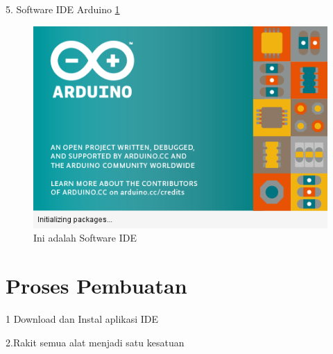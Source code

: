 \documentclass{article}
\begin{document}
 5. Software IDE Arduino
 \ref{ide}
  \begin{figure}[ht]
  \centerline{\includegraphics[width=1\textwidth]{../figures/ide.png}}
  \caption{Ini adalah Software IDE}
  \label{ide}
  \end{figure}


\section{Proses Pembuatan}

1 Download dan Instal aplikasi IDE 

2.Rakit semua alat menjadi satu kesatuan 
\end{document}
